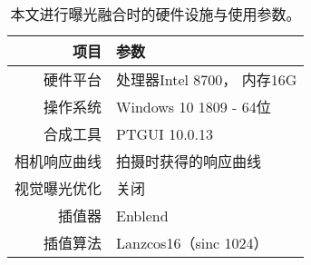 \begin{table}[htbp]
    \centering
    \caption[曝光融合参数列表]{
        \label{table:fusion-config}
        本文进行曝光融合时的硬件设施与使用参数。
    }
    \begin{tabular}{r|l}
        \toprule
        \textbf{项目} & \textbf{参数}\\
        \hline
        硬件平台 & 处理器Intel 8700， 内存16G\\
        操作系统 & Windows 10 1809 - 64位\\
        合成工具 & PTGUI 10.0.13 \cite{ptgui} \\
        \hline
        相机响应曲线  & 拍摄时获得的响应曲线\\
        视觉曝光优化  & 关闭\\
        插值器       & Enblend \\
        插值算法 &  Lanzcos16（sinc 1024）\\
        \bottomrule    
    \end{tabular}
\end{table}